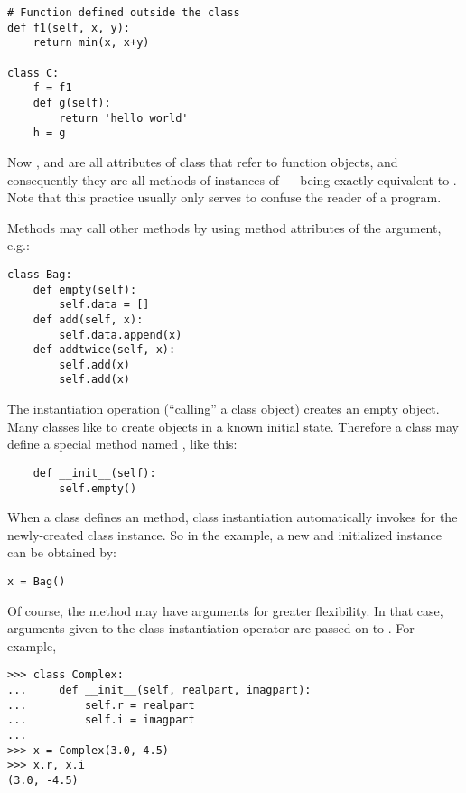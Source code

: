 \documentclass{manual}
\begin{document}
\begin{verbatim}
# Function defined outside the class
def f1(self, x, y):
    return min(x, x+y)

class C:
    f = f1
    def g(self):
        return 'hello world'
    h = g
\end{verbatim}

Now ,  and  are all attributes of class
 that refer to function objects, and consequently they are all
methods of instances of  ---  being exactly equivalent
to .  Note that this practice usually only serves to confuse
the reader of a program.


Methods may call other methods by using method attributes of the
 argument, e.g.:

\begin{verbatim}
class Bag:
    def empty(self):
        self.data = []
    def add(self, x):
        self.data.append(x)
    def addtwice(self, x):
        self.add(x)
        self.add(x)
\end{verbatim}


The instantiation operation (``calling'' a class object) creates an
empty object.  Many classes like to create objects in a known initial
state.  Therefore a class may define a special method named
, like this:

\begin{verbatim}
    def __init__(self):
        self.empty()
\end{verbatim}

When a class defines an  method, class
instantiation automatically invokes  for the
newly-created class instance.  So in the  example, a new
and initialized instance can be obtained by:

\begin{verbatim}
x = Bag()
\end{verbatim}

Of course, the  method may have arguments for
greater flexibility.  In that case, arguments given to the class
instantiation operator are passed on to .  For
example,

\begin{verbatim}
>>> class Complex:
...     def __init__(self, realpart, imagpart):
...         self.r = realpart
...         self.i = imagpart
... 
>>> x = Complex(3.0,-4.5)
>>> x.r, x.i
(3.0, -4.5)
\end{verbatim}
\end{document}
